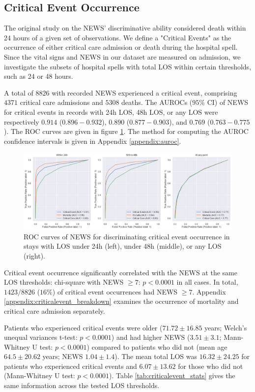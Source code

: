 \documentclass[10pt,journal, compsoc]{IEEEtran}
\begin{document}
\subsection{Critical Event Occurrence} The original study on the NEWS' discriminative ability considered death within 24 hours of a given set of observations. We define a "Critical Events" as the occurrence of either critical care admission or death during the hospital spell. Since the vital signs and NEWS in our dataset are measured on admission, we investigate the subsets of hospital spells with total LOS within certain thresholds, such as 24 or 48 hours.

A total of $8826$ with recorded NEWS experienced a critical event, comprising $4371$ critical care admissions and $5308$ deaths. The AUROCs ($95\%$ CI) of NEWS for critical events in records with 24h LOS, 48h LOS, or any LOS were respectively $0.914$ ($0.896-0.932$), $0.890$ ($0.877-0.903$), and $0.769$ ($0.763-0.775$). The ROC curves are given in figure \ref{fig:criticalevent_roc}. The method for computing the AUROC confidence intervals is given in Appendix \ref{appendix:auroc}.

\begin{figure}[htbp]
    \centering
    \includegraphics[width=\textwidth]{img/critical_roc_multi.png}
    \caption{ROC curves of NEWS for discriminating critical event occurrence in stays with LOS under 24h (left), under 48h (middle), or any LOS (right).}
    \label{fig:criticalevent_roc}
\end{figure}

Critical event occurrence significantly correlated with the NEWS at the same LOS thresholds: chi-square with NEWS $\geq 7$: $p < 0.0001$ in all cases. In total, $1423/8826$ ($16\%$) of critical event occurrences had NEWS $\geq 7$. Appendix \ref{appendix:criticalevent_breakdown} examines the occurrence of mortality and critical care admission separately.

Patients who experienced critical events were older ($71.72 \pm 16.85$ years; Welch's unequal variances t-test: $p < 0.0001$) and had higher NEWS ($3.51 \pm 3.1$; Mann-Whitney U test: $p < 0.0001$) compared to patients who did not (mean age $64.5 \pm 20.62$ years; NEWS $1.04 \pm 1.4$). The mean total LOS was $16.32 \pm 24.25$ for patients who experienced critical events and $6.07 \pm 13.62$ for those who did not (Mann-Whitney U test: $p < 0.0001$). Table \ref{tab:criticalevent_stats} gives the same information across the tested LOS thresholds.
\end{document}
